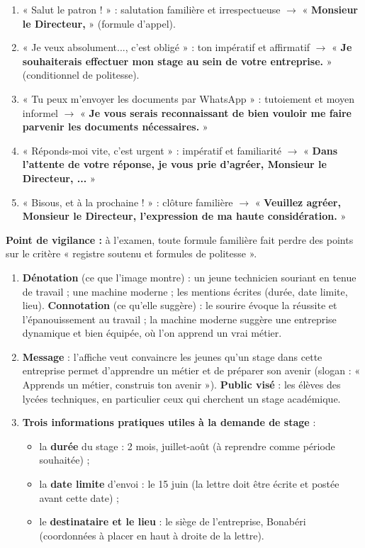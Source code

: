\documentclass[11pt]{article}
\begin{document}
\begin{corrige}
\begin{enumerate}
\item « Salut le patron ! » : salutation familière et irrespectueuse $\rightarrow$ « \textbf{Monsieur le Directeur,} » (formule d'appel).
\item « Je veux absolument..., c'est obligé » : ton impératif et affirmatif $\rightarrow$ « \textbf{Je souhaiterais effectuer mon stage au sein de votre entreprise.} » (conditionnel de politesse).
\item « Tu peux m'envoyer les documents par WhatsApp » : tutoiement et moyen informel $\rightarrow$ « \textbf{Je vous serais reconnaissant de bien vouloir me faire parvenir les documents nécessaires.} »
\item « Réponds-moi vite, c'est urgent » : impératif et familiarité $\rightarrow$ « \textbf{Dans l'attente de votre réponse, je vous prie d'agréer, Monsieur le Directeur, ...} »
\item « Bisous, et à la prochaine ! » : clôture familière $\rightarrow$ « \textbf{Veuillez agréer, Monsieur le Directeur, l'expression de ma haute considération.} »
\end{enumerate}
\textbf{Point de vigilance :} à l'examen, toute formule familière fait perdre des points sur le critère « registre soutenu et formules de politesse ».
\end{corrige}

\begin{corrige}
\begin{enumerate}
\item \textbf{Dénotation} (ce que l'image montre) : un jeune technicien souriant en tenue de travail ; une machine moderne ; les mentions écrites (durée, date limite, lieu). \textbf{Connotation} (ce qu'elle suggère) : le sourire évoque la réussite et l'épanouissement au travail ; la machine moderne suggère une entreprise dynamique et bien équipée, où l'on apprend un vrai métier.
\item \textbf{Message} : l'affiche veut convaincre les jeunes qu'un stage dans cette entreprise permet d'apprendre un métier et de préparer son avenir (slogan : « Apprends un métier, construis ton avenir »). \textbf{Public visé} : les élèves des lycées techniques, en particulier ceux qui cherchent un stage académique.
\item \textbf{Trois informations pratiques utiles à la demande de stage} :
\begin{itemize}
\item la \textbf{durée} du stage : 2 mois, juillet-août (à reprendre comme période souhaitée) ;
\item la \textbf{date limite} d'envoi : le 15 juin (la lettre doit être écrite et postée avant cette date) ;
\item le \textbf{destinataire et le lieu} : le siège de l'entreprise, Bonabéri (coordonnées à placer en haut à droite de la lettre).
\end{itemize}
\end{enumerate}
\end{corrige}
\end{document}
